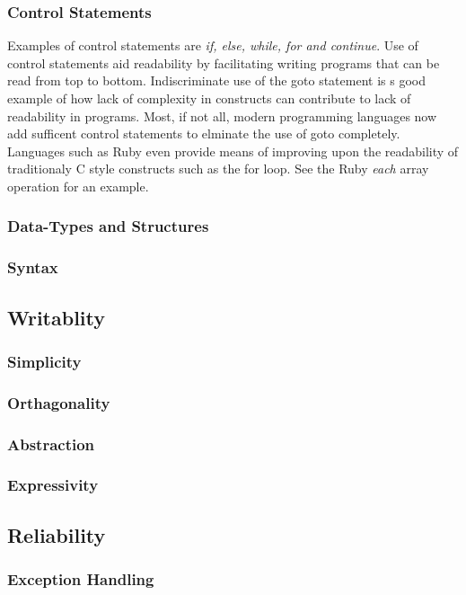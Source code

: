 \documentclass[10pt,a4paper]{article}
\begin{document}
\subsubsection{Control Statements}
Examples of control statements are {\it if, else, while, for and continue}. Use of control statements aid readability by facilitating writing programs that can be read from top to bottom. Indiscriminate use of the goto statement is s good example of how lack of complexity in constructs can contribute to lack of readability in programs. Most, if not all, modern programming languages now add sufficent control statements to elminate the use of goto completely. Languages such as Ruby even provide means of improving upon the readability of traditionaly C style constructs such as the for loop. See the Ruby {\it each} array operation for an example. 
\subsubsection{Data-Types and Structures}

\subsubsection{Syntax}

\subsection{Writablity}
\subsubsection{Simplicity}
\subsubsection{Orthagonality}
\subsubsection{Abstraction}
\subsubsection{Expressivity}


\subsection{Reliability}
\subsubsection{Exception Handling}
\end{document}

